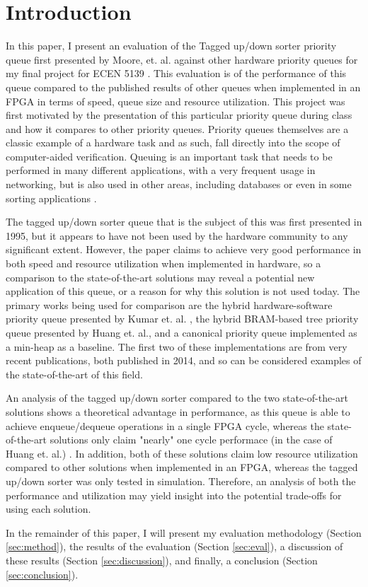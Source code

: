 \section{Introduction}
\label{sec:intro}

In this paper, I present an evaluation of the Tagged up/down sorter priority queue first presented by Moore, et. al. against other hardware priority queues for my final project for ECEN 5139 \cite{Moore95taggedup/down}. This evaluation is of the performance of this queue compared to the published results of other queues when implemented in an FPGA in terms of speed, queue size and resource utilization. This project was first motivated by the presentation of this particular priority queue during class and how it compares to other priority queues. Priority queues themselves are a classic example of a hardware task and as such, fall directly into the scope of computer-aided verification. Queuing is an important task that needs to be performed in many different applications, with a very frequent usage in networking, but is also used in other areas, including databases or even in some sorting applications \cite{huang2014scalable}.

The tagged up/down sorter queue that is the subject of this was first presented in 1995, but it appears to have not been used by the hardware community to any significant extent. However, the paper claims to achieve very good performance in both speed and resource utilization when implemented in hardware, so a comparison to the state-of-the-art solutions may reveal a potential new application of this queue, or a reason for why this solution is not used today. The primary works being used for comparison are the hybrid hardware-software priority queue presented by Kumar et. al. \cite{KumVya13B}, the hybrid BRAM-based tree priority queue presented by Huang et. al., and a canonical priority queue implemented as a min-heap as a baseline. The first two of these implementations are from very recent publications, both published in 2014, and so can be considered examples of the state-of-the-art of this field.

An analysis of the tagged up/down sorter compared to the two state-of-the-art solutions shows a theoretical advantage in performance, as this queue is able to achieve enqueue/dequeue operations in a single FPGA cycle, whereas the state-of-the-art solutions only claim "nearly" one cycle performace (in the case of Huang et. al.) \cite{huang2014scalable}. In addition, both of these solutions  claim low resource utilization compared to other solutions when implemented in an FPGA, whereas the tagged up/down sorter was only tested in simulation. Therefore, an analysis of both the performance and utilization may yield insight into the potential trade-offs for using each solution.

In the remainder of this paper, I will present my evaluation methodology (Section \ref{sec:method}), the results of the evaluation (Section \ref{sec:eval}), a discussion of these results (Section \ref{sec:discussion}), and finally, a conclusion (Section \ref{sec:conclusion}).